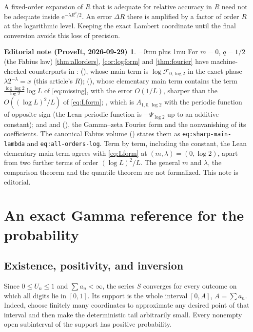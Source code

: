 \documentclass[11pt,a4paper]{article}
\numberwithin{equation}{section}
\theoremstyle{definition}
\newtheorem*{ednoteinner}{Editorial note (ProveIt, 2026-09-29)}
\newenvironment{ednote}{\begin{ednoteinner}\sloppy\Urlmuskip=0mu plus 1mu\relax}{\end{ednoteinner}}
\newcommand{\ee}{\mathrm e}
\newcommand{\calF}{\mathcal F}
\begin{document}
A fixed-order expansion of $R$ that is adequate for relative accuracy in $R$ need not be adequate inside $\ee^{-\lambda R^2/2}$. An error $\Delta R$ there is amplified by a factor of order $R$ at the logarithmic level. Keeping the exact Lambert coordinate until the final conversion avoids this loss of precision.

\begin{ednote}
For $m=0$, $q=1/2$ (the Fabius law) \cref{thm:allorders}, \cref{cor:logform} and \cref{thm:fourier} have machine-checked counterparts in  \cite{ed:fabiuslean}:
 (), whose main term  is $\log\calF_{0,\log2}$ in the exact phase $\lambda2^{-\lambda}=x$ (this article's $R$);
 (), whose elementary main term  contains the term $\frac{\log\log2}{\log2}\log L$ of \eqref{eq:missing}, with the error $O(1/L)$, sharper than the $O((\log L)^2/L)$ of \eqref{eq:Lform};
, which is $A_{1,0,\log2}$ with the periodic function of opposite sign (the Lean periodic function is $-\Psi_{\log2}$ up to an additive constant); and
 and  (), the Gamma--zeta Fourier form and the nonvanishing of its coefficients.
The canonical Fabius volume () states them as \texttt{eq:sharp-main-lambda} and \texttt{eq:all-orders-log}. Term by term, including the constant, the Lean elementary main term agrees with \eqref{eq:Lform} at $(m,\lambda)=(0,\log2)$, apart from two further terms of order $(\log L)^2/L$. The general $m$ and $\lambda$, the comparison theorem and the quantile theorem are not formalized. This note is editorial.
\end{ednote}

\section{An exact Gamma reference for the probability}
\label{sec:gamma}

\subsection{Existence, positivity, and inversion}
Since $0\leq U_n\leq1$ and $\sum a_n<\infty$, the series $S$ converges for every outcome on which all digits lie in $[0,1]$. Its support is the whole interval $[0,A]$, $A=\sum a_n$. Indeed, choose finitely many coordinates to approximate any desired point of that interval and then make the deterministic tail arbitrarily small. Every nonempty open subinterval of the support has positive probability.
\end{document}
